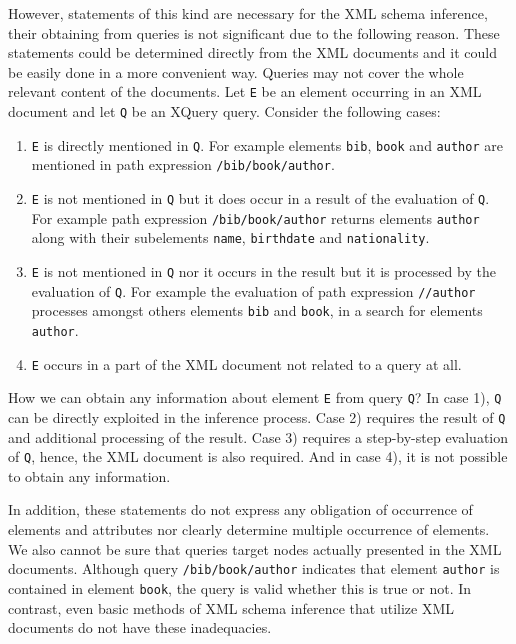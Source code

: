 However, statements of this kind are necessary for the XML schema inference, their obtaining from queries is not significant due to the following reason. These statements could be determined directly from the XML documents and it could be easily done in a more convenient way. Queries may not cover the whole relevant content of the documents. Let \texttt{E} be an element occurring in an XML document and let \texttt{Q} be an XQuery query. Consider the following cases:

\begin{enumerate}[1)]
\item \texttt{E} is directly mentioned in \texttt{Q}. For example elements \texttt{bib}, \texttt{book} and \texttt{author} are mentioned in path expression \texttt{/bib/book/author}.
\item \texttt{E} is not mentioned in \texttt{Q} but it does occur in a result of the evaluation of \texttt{Q}. For example path expression \texttt{/bib/book/author} returns elements \texttt{author} along with their subelements \texttt{name}, \texttt{birthdate} and \texttt{nationality}.
\item \texttt{E} is not mentioned in \texttt{Q} nor it occurs in the result but it is processed by the evaluation of \texttt{Q}. For example the evaluation of path expression \texttt{//author} processes amongst others elements \texttt{bib} and \texttt{book}, in a search for elements \texttt{author}.
\item \texttt{E} occurs in a part of the XML document not related to a query at all.
\end{enumerate}

How we can obtain any information about element \texttt{E} from query \texttt{Q}? In case 1), \texttt{Q} can be directly exploited in the inference process. Case 2) requires the result of \texttt{Q} and additional processing of the result. Case 3) requires a step-by-step evaluation of \texttt{Q}, hence, the XML document is also required. And in case 4), it is not possible to obtain any information. 

In addition, these statements do not express any obligation of occurrence of elements and attributes nor clearly determine multiple occurrence of elements. We also cannot be sure that queries target nodes actually presented in the XML documents. Although query \texttt{/bib/book/author} indicates that element \texttt{author} is contained in element \texttt{book}, the query is valid whether this is true or not. In contrast, even basic methods of XML schema inference that utilize XML documents do not have these inadequacies.

